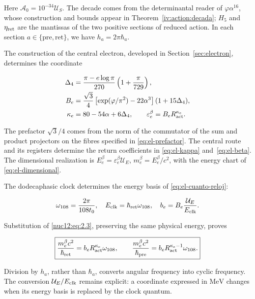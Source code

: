 Here \(\mathcal A_0=10^{-34}\mathcal U_S\). The decade comes from the determinantal reader of \(\varphi\alpha^{16}\), whose construction and bounds appear in Theorem~\ref{iv:action:decada}; \(H_5\) and \(\eta_{\rm ret}\) are the mantissas of the two positive sections of reduced action. In each section \(a\in\{\mathrm{pre},\mathrm{ret}\}\), we have \(h_a=2\pi\hbar_a\).

The construction of the central electron, developed in Section~\ref{sec:electron}, determines the coordinate

\begin{equation}
\begin{aligned}
\Delta_4&=\frac{\pi-e\log\pi}{270}\left(1+\frac{\pi}{729}\right),\\
B_e&=\frac{\sqrt3}{4}
\left[\exp(\varphi/\pi^2)-22\alpha^3\right](1+15\Delta_4),\\
\kappa_e&=80-54\alpha+6\Delta_4,\qquad
\varepsilon_e^\beta=B_eR_{\rm act}^{\kappa_e}.
\end{aligned}
\label{nuc12:eq:2.3}
\end{equation}

The prefactor \(\sqrt3/4\) comes from the norm of the commutator of the sum and product projectors on the fibres specified in \eqref{eq:el-prefactor}. The central route and its registers determine the return coefficients in \eqref{eq:el-kappa} and~\eqref{eq:el-beta}. The dimensional realization is \(E_e^\beta=\varepsilon_e^\beta\mathcal U_E\), \(m_e^\beta=E_e^\beta/c^2\), with the energy chart of \eqref{eq:el-dimensional}.

The dodecaphasic clock determines the energy basis of \eqref{eq:el-cuanto-reloj}:

\[
\omega_{108}=\frac{2\pi}{108t_0},\quad
E_{\rm clk}=\hbar_{\rm ret}\omega_{108},\quad
b_e=B_e\frac{\mathcal U_E}{E_{\rm clk}}.
\]

Substitution of \eqref{nuc12:eq:2.3}, preserving the same physical energy, proves

\begin{equation}
\boxed{\frac{m_e^\beta c^2}{\hbar_{\rm ret}}
=b_eR_{\rm act}^{\kappa_e}\omega_{108},\qquad
\frac{m_e^\beta c^2}{\hbar_{\rm pre}}
=b_eR_{\rm act}^{\kappa_e-1}\omega_{108}.}
\label{nuc12:eq:2.4}
\end{equation}

Division by \(h_a\), rather than \(\hbar_a\), converts angular frequency into cyclic frequency. The conversion \(\mathcal U_E/E_{\rm clk}\) remains explicit: a coordinate expressed in \(\mathrm{MeV}\) changes when its energy basis is replaced by the clock quantum.

